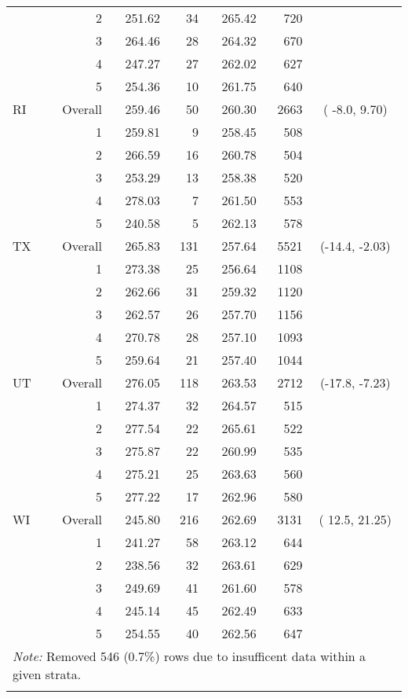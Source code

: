 \begin{longtable}{lrrr@{\extracolsep{.25cm}}rrc}
   & 2 & 251.62 &  34 & 265.42 & 720 &  \\ 
   & 3 & 264.46 &  28 & 264.32 & 670 &  \\ 
   & 4 & 247.27 &  27 & 262.02 & 627 &  \\ 
   & 5 & 254.36 &  10 & 261.75 & 640 &  \\ 
   \hline
RI & Overall & 259.46 &  50 & 260.30 & 2663 & ( -8.0,   9.70) \\ 
   & 1 & 259.81 &   9 & 258.45 & 508 &  \\ 
   & 2 & 266.59 &  16 & 260.78 & 504 &  \\ 
   & 3 & 253.29 &  13 & 258.38 & 520 &  \\ 
   & 4 & 278.03 &   7 & 261.50 & 553 &  \\ 
   & 5 & 240.58 &   5 & 262.13 & 578 &  \\ 
   \hline
TX & Overall & 265.83 & 131 & 257.64 & 5521 & (-14.4,  -2.03) \\ 
   & 1 & 273.38 &  25 & 256.64 & 1108 &  \\ 
   & 2 & 262.66 &  31 & 259.32 & 1120 &  \\ 
   & 3 & 262.57 &  26 & 257.70 & 1156 &  \\ 
   & 4 & 270.78 &  28 & 257.10 & 1093 &  \\ 
   & 5 & 259.64 &  21 & 257.40 & 1044 &  \\ 
   \hline
UT & Overall & 276.05 & 118 & 263.53 & 2712 & (-17.8,  -7.23) \\ 
   & 1 & 274.37 &  32 & 264.57 & 515 &  \\ 
   & 2 & 277.54 &  22 & 265.61 & 522 &  \\ 
   & 3 & 275.87 &  22 & 260.99 & 535 &  \\ 
   & 4 & 275.21 &  25 & 263.63 & 560 &  \\ 
   & 5 & 277.22 &  17 & 262.96 & 580 &  \\ 
   \hline
WI & Overall & 245.80 & 216 & 262.69 & 3131 & ( 12.5,  21.25) \\ 
   & 1 & 241.27 &  58 & 263.12 & 644 &  \\ 
   & 2 & 238.56 &  32 & 263.61 & 629 &  \\ 
   & 3 & 249.69 &  41 & 261.60 & 578 &  \\ 
   & 4 & 245.14 &  45 & 262.49 & 633 &  \\ 
   & 5 & 254.55 &  40 & 262.56 & 647 &  \\ 
   \hline \multicolumn{7}{l}{\textit{Note:} Removed 546 (0.7\%) rows due to insufficent data within a given strata.} \\\hline
\label{g8read-mlpsa-lr}
\end{longtable}

